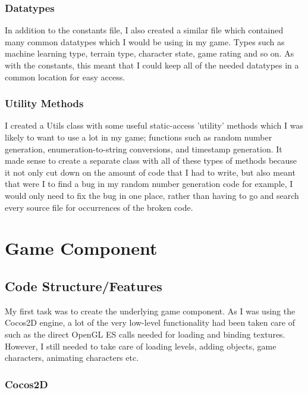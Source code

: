 \documentclass[a4paper,oneside]{report}
\begin{document}
\subsection{Datatypes} 

In addition to the constants file, I also created a similar file which contained many common datatypes which I would be using in my game. Types such as machine learning type, terrain type, character state, game rating and so on. As with the constants, this meant that I could keep all of the needed datatypes in a common location for easy access.

\subsection{Utility Methods} 

I created a Utils class with some useful static-access 'utility' methods which I was likely to want to use a lot in my game; functions such as random number generation, enumeration-to-string conversions, and timestamp generation. It made sense to create a separate class with all of these types of methods because it not only cut down on the amount of code that I had to write, but also meant that were I to find a bug in my random number generation code for example, I would only need to fix the bug in one place, rather than having to go and search every source file for occurrences of the broken code. 

\chapter{Game Component}
		
\section{Code Structure/Features}

My first task was to create the underlying game component. As I was using the Cocos2D engine, a lot of the very low-level functionality had been taken care of such as the direct OpenGL ES calls needed for loading and binding textures. However, I still needed to take care of loading levels, adding objects, game characters, animating characters etc.

\subsection{Cocos2D} 
\end{document}
